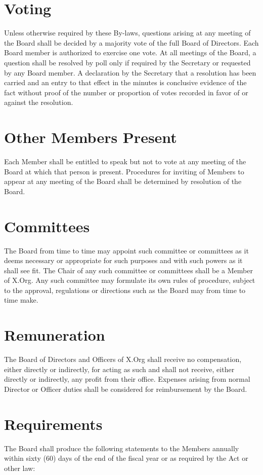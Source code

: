 \documentclass[10pt, english]{bylaws}
\begin{document}
\section{Voting}
Unless otherwise required by these By-laws, questions arising at any meeting of
the Board shall be decided by a majority vote of the full Board of Directors.
Each Board member is authorized to exercise one vote. At all meetings of the
Board, a question shall be resolved by poll only if required by the Secretary or
requested by any Board member. A declaration by the Secretary that a resolution
has been carried and an entry to that effect in the minutes is conclusive
evidence of the fact without proof of the number or proportion of votes recorded
in favor of or against the resolution.

\section{Other Members Present}
Each Member shall be entitled to speak but not to vote at any meeting of the
Board at which that person is present. Procedures for inviting of Members to
appear at any meeting of the Board shall be determined by resolution of the
Board.

\section{Committees}
The Board from time to time may appoint such committee or committees as it deems
necessary or appropriate for such purposes and with such powers as it shall see
fit. The Chair of any such committee or committees shall be a Member of X.Org.
Any such committee may formulate its own rules of procedure, subject to the
approval, regulations or directions such as the Board may from time to time
make.

\section{Remuneration}
The Board of Directors and Officers of X.Org shall receive no compensation,
either directly or indirectly, for acting as such and shall not receive, either
directly or indirectly, any profit from their office. Expenses arising from
normal Director or Officer duties shall be considered for reimbursement by the
Board.

\section{Requirements}
The Board shall produce the following statements to the Members annually within
sixty (60) days of the end of the fiscal year or as required by the Act or
other law:
\end{document}
